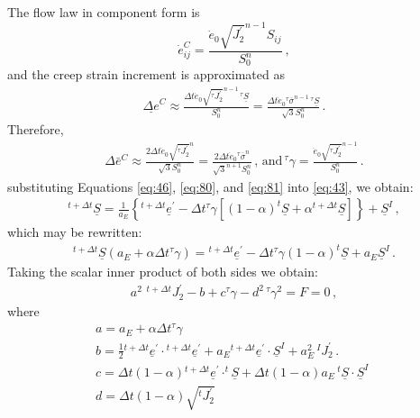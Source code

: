 The flow law in component form is 
\begin{equation}
\dot{e}_{ij}^{C}=\frac{\dot{e}_{0}\sqrt{J_{2}^{\prime}}^{n-1}S_{ij}}{S_{0}^{n}}\:,\label{eq:79}
\end{equation}
and the creep strain increment is approximated as
\begin{gather}
\underline{\Delta e}^{C}\approx\frac{\Delta t\dot{e}_{0}\sqrt{^{\tau}J_{2}^{\prime}}^{n-1}\,^{\tau}\underline{S}}{S_{0}^{n}}=\frac{\Delta t\dot{e}_{0}\phantom{}^{\tau}\overline{\sigma}^{n-1}\,^{\tau}\underline{S}}{\sqrt{3}S_{0}^{n}}\,.\label{eq:80}
\end{gather}
 Therefore,
\begin{gather}
\Delta\bar{e}^{C}\approx\frac{2\Delta t\dot{e}_{0}\sqrt{^{\tau}J_{2}^{\prime}}^{n}}{\sqrt{3}S_{0}^{n}}=\frac{2\Delta t\dot{e}_{0}\phantom{}^{\tau}\overline{\sigma}^{n}}{\sqrt{3}^{n+1}S_{0}^{n}}\,,\,\textrm{and}\,^{\tau}\gamma=\frac{\dot{e}_{0}\sqrt{^{\tau}J_{2}^{\prime}}^{n-1}}{S_{0}^{n}}\,.\label{eq:81}
\end{gather}
substituting Equations \ref{eq:46}, \ref{eq:80}, and \ref{eq:81}
into \ref{eq:43}, we obtain:
\begin{gather}
^{t+\Delta t}\underline{S}=\frac{1}{a_{E}}\left\{ ^{t+\Delta t}\underline{e}^{\prime}-\Delta t\phantom{}^{\tau}\gamma\left[\left(1-\alpha\right)^{t}\underline{S}+\alpha{}^{t+\Delta t}\underline{S}\right]\right\} +\underline{S}^{I}\,,\label{eq:82}
\end{gather}
which may be rewritten:
\begin{gather}
^{t+\Delta t}\underline{S}\left(a_{E}+\alpha\Delta t\phantom{}^{\tau}\gamma\right)={}^{t+\Delta t}\underline{e}^{\prime}-\Delta t\phantom{}^{\tau}\gamma\left(1-\alpha\right)^{t}\underline{S}+a_{E}\underline{S}^{I}\,.\label{eq:83}
\end{gather}
Taking the scalar inner product of both sides we obtain:
\begin{gather}
a^{2}\,\,{}^{t+\Delta t}J_{2}^{\prime}-b+c\phantom{}^{\tau}\gamma-d^{2}\,^{\tau}\gamma^{2}=F=0\,,\label{eq:84}
\end{gather}
where
\begin{gather}
a=a_{E}+\alpha\Delta t\phantom{}^{\tau}\gamma\,\,\nonumber \\
b=\frac{1}{2}{}^{t+\Delta t}\underline{e}^{\prime}\cdot{}^{t+\Delta t}\underline{e}^{\prime}+a_{E}{}^{t+\Delta t}\underline{e}^{\prime}\cdot\underline{S}^{I}+a_{E}^{2}\,^{I}J_{2}^{\prime}\,.\label{eq:85}\\
c=\Delta t\left(1-\alpha\right){}^{t+\Delta t}\underline{e}^{\prime}\cdot^{t}\underline{S}+\Delta t\left(1-\alpha\right)a_{E}\,^{t}\underline{S}\cdot\underline{S}^{I}\,\,\nonumber \\
d=\Delta t\left(1-\alpha\right)\sqrt{^{t}J_{2}^{\prime}}\,\,\nonumber 
\end{gather}
